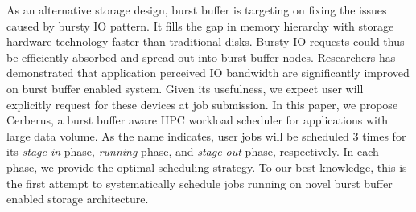 As an alternative storage design, burst buffer\cite{Bent:HBP:2011, Grider:EXA:2010}
is targeting on fixing the issues caused by bursty IO pattern.
It fills the gap in memory hierarchy with storage hardware technology
faster than traditional disks.
Bursty IO requests could thus be efficiently absorbed and spread out
into burst buffer nodes.
Researchers\cite{Liu:MSST:2012} has demonstrated that application perceived IO
bandwidth are significantly improved on burst buffer enabled system.
Given its usefulness, we expect user will explicitly request for
these devices at job submission.
In this paper, we propose Cerberus, a burst buffer aware HPC workload scheduler
for applications with large data volume.
As the name indicates, user jobs will be scheduled 3 times
for its \textit{stage in} phase, \textit{running} phase,
and \textit{stage-out} phase, respectively.
In each phase, we provide the optimal scheduling strategy.
To our best knowledge,
this is the first attempt to systematically schedule jobs
running on novel burst buffer enabled storage architecture.


